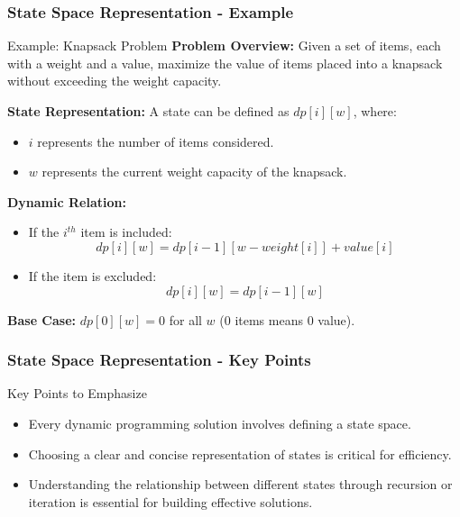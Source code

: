 \documentclass[aspectratio=169]{beamer}
\begin{document}
\begin{frame}[fragile]
    \frametitle{State Space Representation - Example}
    \begin{block}{Example: Knapsack Problem}
        \textbf{Problem Overview:}
        Given a set of items, each with a weight and a value, maximize the value of items placed into a knapsack without exceeding the weight capacity.
        
        \textbf{State Representation:}  
        A state can be defined as $dp[i][w]$, where:
        \begin{itemize}
            \item $i$ represents the number of items considered.
            \item $w$ represents the current weight capacity of the knapsack.
        \end{itemize}
        
        \textbf{Dynamic Relation:}
        \begin{itemize}
            \item If the $i^{th}$ item is included:  
            \begin{equation}
                dp[i][w] = dp[i-1][w - weight[i]] + value[i]
            \end{equation}
            \item If the item is excluded:  
            \begin{equation}
                dp[i][w] = dp[i-1][w]
            \end{equation}
        \end{itemize}
        
        \textbf{Base Case:}  
        $dp[0][w] = 0$ for all $w$ (0 items means 0 value).
    \end{block}
\end{frame}

\begin{frame}[fragile]
    \frametitle{State Space Representation - Key Points}
    \begin{block}{Key Points to Emphasize}
        \begin{itemize}
            \item Every dynamic programming solution involves defining a state space.
            \item Choosing a clear and concise representation of states is critical for efficiency.
            \item Understanding the relationship between different states through recursion or iteration is essential for building effective solutions.
        \end{itemize}
    \end{block}
\end{frame}
\end{document}
